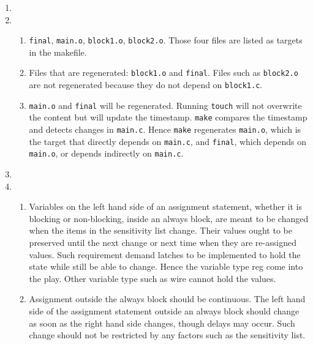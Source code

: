 \documentclass[11pt,letterpaper,titlepage]{article}
\begin{document}
\begin{enumerate}
    
    \item 
    
    \item %
    
    \begin{enumerate}
        
        \item \verb|final|, \verb|main.o|, \verb|block1.o|, \verb|block2.o|. Those four files are listed as targets in the makefile.
        
        \item Files that are regenerated: \verb|block1.o| and \verb|final|. Files such as \verb|block2.o| are not regenerated because they do not depend on \verb|block1.c|. 
        
        \item \verb|main.o| and \verb|final| will be regenerated. Running \verb|touch| will not overwrite the content but will update the timestamp. \verb|make| compares the timestamp and detects changes in \verb|main.c|. Hence \verb|make| regenerates \verb|main.o|, which is the target that directly depends on \verb|main.c|, and \verb|final|, which depends on \verb|main.o|, or depends indirectly on \verb|main.c|.
        
    \end{enumerate}
    
    \item %
    
    \item %
    
    \begin{enumerate}
        
        \item Variables on the left hand side of an assignment statement, whether it is blocking or non-blocking, inside an always block, are meant to be changed when the items in the sensitivity list change. Their values ought to be preserved until the next change or next time when they are re-assigned values. Such requirement demand latches to be implemented to hold the state while still be able to change. Hence the variable type reg come into the play. Other variable type such as wire cannot hold the values.
        
        \item Assignment outside the always block should be continuous. The left hand side of the assignment statement outside an always block should change as soon as the right hand side changes, though delays may occur. Such change should not be restricted by any factors such as the sensitivity list.
        

\end{enumerate}
\end{enumerate}
\end{document}
